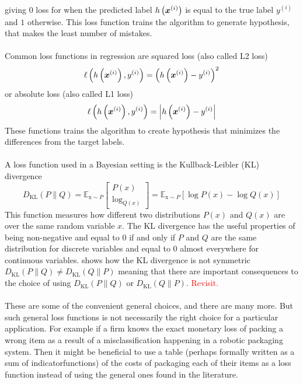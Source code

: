 giving $0$ loss for when the predicted label $h\left (\boldsymbol{x}^{(i)}\right)$ is equal to the true label $y^{(i)}$ and $1$ otherwise. This loss function trains the algorithm to generate hypothesis, that makes the least number of mistakes. \\
\\
Common loss functions in regression are squared loss (also called L2 loss)
\begin{equation} \label{eq:mse}
    \ell\left(h\left (\boldsymbol{x}^{(i)}\right), y^{(i)} \right) = \left ( h\left (\boldsymbol{x}^{(i)}\right) - y^{(i)} \right)^2
\end{equation}
or absolute loss (also called L1 loss)
$$ \ell\left(h\left (\boldsymbol{x}^{(i)}\right), y^{(i)}\right) = \left |h\left (\boldsymbol{x}^{(i)}\right) - y^{(i)}\right|$$
These functions trains the algorithm to create hypothesis that minimizes the differences from the target labels. \\
\\
A loss function used in a Bayesian setting is the Kullback-Leibler (KL) divergence
\begin{equation}
    D_{\mathrm{KL}}(P \| Q)=\mathbb{E}_{\mathrm{x} \sim P}\left[\begin{array}{c}
P(x) \\
\log _{Q(x)}
\end{array}\right]=\mathbb{E}_{\mathrm{x} \sim P}[\log P(x)-\log Q(x)]
\end{equation}
This function measures how different two distributions $P(x)$ and $Q(x)$ are over the same random variable $x$. The KL divergence has the useful properties of being non-negative and equal to $0$ if and only if $P$ and $Q$ are the same distribution for discrete variables and equal to $0$ almost everywhere for continuous variables. \cite{Goodfellow-et-al-2016} shows how the KL divergence is not symmetric $D_{\text{KL}}(P \| Q) \neq D_{\text{KL}}(Q \| P)$ meaning that there are important consequences to the choice of using $D_{\text{KL}}(P \| Q)$ or $D_{\text{KL}}(Q \| P)$. \textcolor{red}{Revisit.}
\\
\\
These are some of the convenient general choices, and there are many more. But such general loss functions is not necessarily the right choice for a particular application. For example if a firm knows the exact monetary loss of packing a wrong item as a result of a misclassification happening in a robotic packaging system. Then it might be beneficial to use a table (perhaps formally written as a sum of indicatorfunctions) of the costs of packaging each of their items as a loss function instead of using the general ones found in the literature.

